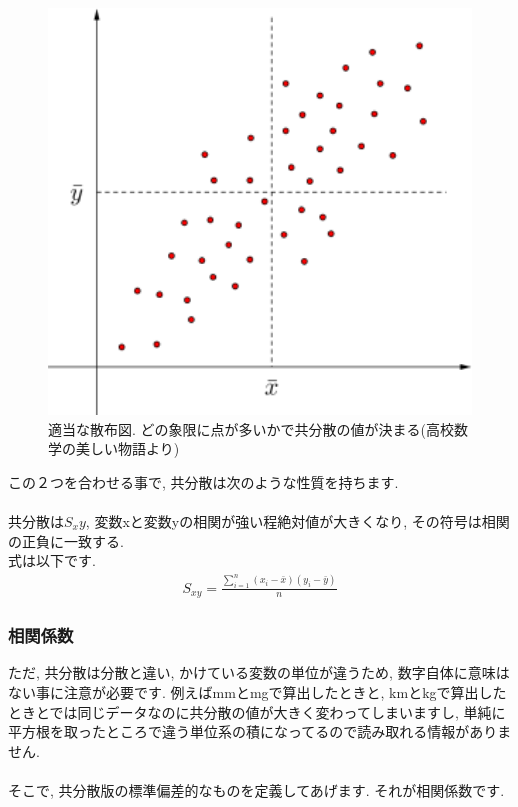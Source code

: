 \documentclass[11pt,a4paper]{jreport}
\begin{document}
\begin{figure}[H]
\label{im:co-var}
  \centering
  \includegraphics[width=120mm,bb=0 0 432 288]{figures/kyoubunnsann.png}
  \caption{適当な散布図. どの象限に点が多いかで共分散の値が決まる(高校数学の美しい物語より)}
\end{figure}

この２つを合わせる事で, 共分散は次のような性質を持ちます.\\
\\
共分散は$S_xy$, 変数xと変数yの相関が強い程絶対値が大きくなり, その符号は相関の正負に一致する.
\\
式は以下です.\\
\begin{eqnarray}
\label{eq:covar}
S_{xy} = \frac{\sum_{i=1}^{n} (x_i - \bar{x})(y_i - \bar{y})}{n}
\end{eqnarray}

\subsubsection{相関係数}
ただ, 共分散は分散と違い, かけている変数の単位が違うため, 数字自体に意味はない事に注意が必要です. 例えばmmとmgで算出したときと, kmとkgで算出したときとでは同じデータなのに共分散の値が大きく変わってしまいますし, 単純に平方根を取ったところで違う単位系の積になってるので読み取れる情報がありません.\\
\\
そこで, 共分散版の標準偏差的なものを定義してあげます. それが相関係数です.\\
\end{document}
